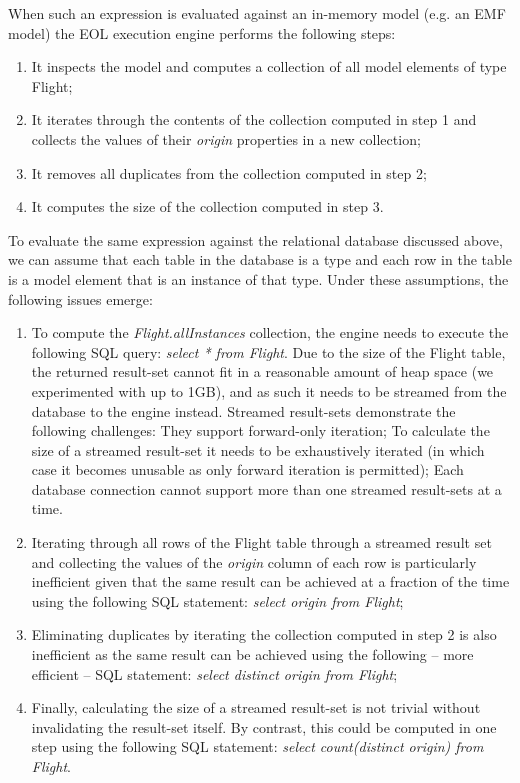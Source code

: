When such an expression is evaluated against an in-memory model (e.g. an EMF model) the EOL execution engine performs the following steps:
\begin{enumerate}
  \item It inspects the model and computes a collection of all model elements of type Flight;
  \item It iterates through the contents of the collection computed in step 1 and collects the values of their \emph{origin} properties in a new collection;
  \item It removes all duplicates from the collection computed in step 2;
  \item It computes the size of the collection computed in step 3.
\end{enumerate}

To evaluate the same expression against the relational database discussed above, we can assume that each table in the database is a type and each row in the table is a model element that is an instance of that type. Under these assumptions, the following issues emerge:
\begin{enumerate}
  \item To compute the \emph{Flight.allInstances} collection, the engine needs to execute the following SQL query: \emph{select * from Flight}. Due to the size of the Flight table, the returned result-set cannot fit in a reasonable amount of heap space (we experimented with up to 1GB), and as such it needs to be streamed from the database to the engine instead. Streamed result-sets demonstrate the following challenges:
  \subitem They support forward-only iteration;
  \subitem To calculate the size of a streamed result-set it needs to be exhaustively iterated (in which case it becomes unusable as only forward iteration is permitted);
  \subitem Each database connection cannot support more than one streamed result-sets at a time.
  \item Iterating through all rows of the Flight table through a streamed result set and collecting the values of the \emph{origin} column of each row is particularly inefficient given that the same result can be achieved at a fraction of the time using the following SQL statement: \emph{select origin from Flight};
  \item Eliminating duplicates by iterating the collection computed in step 2 is also inefficient as the same result can be achieved using the following -- more efficient -- SQL statement: \emph{select distinct origin from Flight};
  \item Finally, calculating the size of a streamed result-set is not trivial without invalidating the result-set itself. By contrast, this could be computed in one step using the following SQL statement: \emph{select count(distinct origin) from Flight}.
\end{enumerate}

